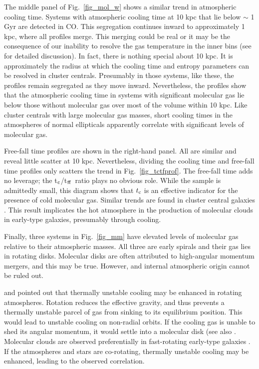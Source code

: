 \documentclass[iop]{emulateapj}
\newcommand{\tctff}{{t$_{\rm c}$/t$_{\rm ff}$}}
\begin{document}
The middle panel of Fig.~\ref{fig_mol_w} shows a similar trend in atmospheric cooling time.   Systems with atmospheric cooling time at 10 kpc that lie below $\sim$ 1 Gyr are detected in CO. This segregation continues inward to approximately 1 kpc, where all profiles merge.  This merging could be real or it may be the consequence of our inability to resolve the gas temperature in the inner bins (see \citet{Hogan:17} for detailed discussion). In fact, there is nothing special about 10 kpc. It is approximately the radius at which the cooling time and entropy parameters can be resolved in cluster centrals. Presumably in those systems, like these, the profiles remain segregated as they move inward. Nevertheless, the profiles show that the atmospheric cooling time in systems with significant molecular gas lie below those without molecular gas over most of the volume within 10 kpc. Like cluster centrals with large molecular gas masses, short cooling times in the atmospheres of normal ellipticals apparently correlate with significant levels of molecular gas. 

Free-fall time profiles are shown in the right-hand panel.  All are similar and reveal little scatter at 10 kpc.  Nevertheless, dividing the cooling time and free-fall time profiles only scatters the trend in Fig.~\ref{fig_tctfprof}.  The free-fall time adds no leverage;   the \tctff\ ratio plays no obvious role. While the sample is admittedly small, this diagram shows that $t_{\rm c}$ is an effective indicator for the presence of cold molecular gas.  Similar trends are found in cluster central galaxies \citep{Hogan:17a, Pulido:17, Babyk17nature}.  This result implicates the hot atmosphere in the production of molecular clouds in early-type galaxies, presumably through cooling.

Finally, three systems in Fig.~\ref{fig_mm} have elevated levels of molecular gas relative to their atmospheric masses.  All three are early spirals and their gas lies in rotating disks.  Molecular disks are often attributed to high-angular momentum mergers, and this may be true.  However, and internal atmospheric origin cannot be ruled out. 

\citet{Werner:14} and \citet{Negri:14} pointed out that thermally unstable cooling may be enhanced in rotating atmospheres. Rotation reduces the effective gravity, and thus prevents a thermally unstable parcel of gas from sinking to its equilibrium position. This would lead to unstable cooling on non-radial orbits. If the cooling gas is unable to shed its angular momentum, it would settle into a molecular disk (see also \citet{Sobacchi:19a}.  Molecular clouds are observed preferentially in fast-rotating early-type galaxies \citep{Davis:19}.  If the atmospheres and stars are co-rotating, thermally unstable cooling may be enhanced, leading to the observed correlation.
\end{document}
